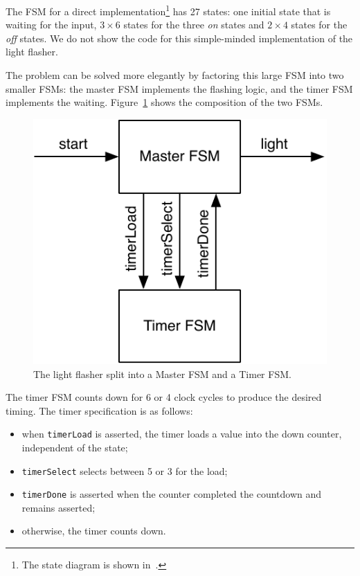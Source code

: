 \documentclass[%
    10pt,
    headinclude, footexclude,
    openright, %
    notitlepage,
    cleardoubleempty,
    headsepline,
    pointlessnumbers,
    bibtotoc, idxtotoc,
    ]{scrbook}
\newcommand{\code}[1]{{\small{\texttt{#1}}}}
\newcommand{\scale}{0.7}
\begin{document}
The FSM for a direct implementation\footnote{The state diagram is shown
in~\cite[p.~376]{dally:vhdl:2016}.} has 27 states:
one initial state that is waiting for the input, $3 \times 6$ states for the three
\emph{on} states and $2 \times 4$ states for the \emph{off} states.
We do not show the code for this simple-minded implementation of the light
flasher.

The problem can be solved more elegantly by factoring this large FSM into
two smaller FSMs: the master FSM implements the flashing logic, and the timer FSM
implements the waiting. Figure~\ref{fig:flasher} shows the composition of
the two FSMs.

\begin{figure}
  \centering
  \includegraphics[scale=\scale]{figures/flasher}
  \caption{The light flasher split into a Master FSM and a Timer FSM.}
  \label{fig:flasher}
\end{figure}

The timer FSM counts down for 6 or 4 clock cycles to produce the desired timing.
The timer specification is as follows:

\begin{itemize}
\item when \code{timerLoad} is asserted, the timer loads a value into the down counter,
independent of the state;
\item \code{timerSelect} selects between 5 or 3 for the load;
\item \code{timerDone} is asserted when the counter completed the countdown
and remains asserted;
\item otherwise, the timer counts down.
\end{itemize}
\end{document}
